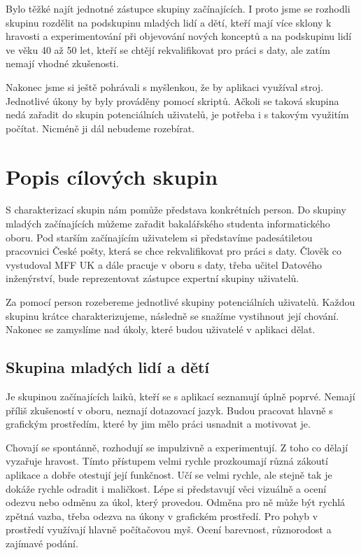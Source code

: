 Bylo těžké najít jednotné zástupce skupiny začínajících. I proto jsme se rozhodli skupinu rozdělit na podskupinu mladých lidí a dětí, kteří mají více sklony k hravosti a experimentování při objevování nových konceptů a na podskupinu lidí ve věku 40 až 50 let, kteří se chtějí rekvalifikovat pro práci s daty, ale zatím nemají vhodné zkušenosti.

Nakonec jsme si ještě pohrávali s myšlenkou, že by aplikaci využíval stroj. Jednotlivé úkony by byly prováděny pomocí skriptů. Ačkoli se taková skupina nedá zařadit do skupin potenciálních uživatelů, je potřeba i s takovým využitím počítat. Nicméně ji dál nebudeme rozebírat.

\section{Popis cílových skupin}

S charakterizací skupin nám pomůže představa konkrétních person. Do skupiny mladých začínajících můžeme zařadit bakalářského studenta informatického oboru. Pod starším začínajícím uživatelem si představíme padesátiletou pracovnici České pošty, která se chce rekvalifikovat pro práci s daty. Člověk co vystudoval MFF UK a dále pracuje v oboru s daty, třeba učitel Datového inženýrství, bude reprezentovat zástupce expertní skupiny uživatelů. 

Za pomocí person rozebereme jednotlivé skupiny potenciálních uživatelů. Každou skupinu krátce charakterizujeme, následně se snažíme vystihnout její chování. Nakonec se zamyslíme nad úkoly, které budou uživatelé v aplikaci dělat.

\subsection{Skupina mladých lidí a dětí}

Je skupinou začínajících laiků, kteří se s aplikací seznamují úplně poprvé. Nemají příliš zkušeností v oboru, neznají dotazovací jazyk. Budou pracovat hlavně s grafickým prostředím, které by jim mělo práci usnadnit a motivovat je.

Chovají se spontánně, rozhodují se impulzivně a experimentují. Z toho co dělají vyzařuje hravost. Tímto přístupem velmi rychle prozkoumají různá zákoutí aplikace a dobře otestují její funkčnost. Učí se velmi rychle, ale stejně tak je dokáže rychle odradit i maličkost. Lépe si představují věci vizuálně a ocení odezvu nebo odměnu za úkol, který provedou. Odměna pro ně může být rychlá zpětná vazba, třeba odezva na úkony v grafickém prostředí. Pro pohyb v prostředí využívají hlavně počítačovou myš. Ocení barevnost, různorodost a zajímavé podání.

